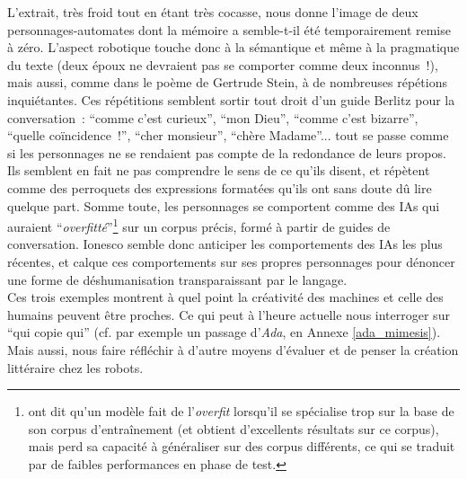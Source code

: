 \documentclass{article}
\begin{document}
				L'extrait, très froid tout en étant très cocasse, nous donne l'image de deux personnages-automates dont la mémoire a semble-t-il été temporairement remise à zéro. L'aspect robotique touche donc à la sémantique et même à la pragmatique du texte (deux époux ne devraient pas se comporter comme deux inconnus~!), mais aussi, comme dans le poème de Gertrude Stein, à de nombreuses répétions inquiétantes. Ces répétitions semblent sortir tout droit d'un guide Berlitz pour la conversation~: ``comme c'est curieux'', ``mon Dieu'', ``comme c'est
				bizarre'', ``quelle coïncidence~!'', ``cher monsieur'', ``chère Madame''... tout se passe comme si les personnages ne se rendaient pas compte de la redondance de leurs propos. Ils semblent en fait ne pas comprendre le sens de ce qu'ils disent, et répètent comme des perroquets des expressions formatées qu'ils ont sans doute dû lire quelque part. Somme toute, les personnages se comportent comme des IAs qui auraient ``\textit{overfitté}''\footnote{ont dit qu'un modèle fait de l'\textit{overfit} lorsqu'il se spécialise trop sur la base de son corpus d'entraînement (et obtient d'excellents résultats sur ce corpus), mais perd sa capacité à généraliser sur des corpus différents, ce qui se traduit par de faibles performances en phase de test.} sur un corpus précis, formé à partir de guides de conversation. Ionesco semble donc anticiper les comportements des IAs les plus récentes, et calque ces comportements sur ses propres personnages pour dénoncer une forme de déshumanisation transparaissant par le langage.\\
				
				
				Ces trois exemples montrent à quel point la créativité des machines et celle des humains peuvent être proches. Ce qui peut à l'heure actuelle nous interroger sur ``qui copie qui'' (cf. par exemple un passage d'\textit{Ada}, en Annexe \ref{ada_mimesis}). Mais aussi, nous faire réfléchir à d'autre moyens d'évaluer et de penser la création littéraire chez les robots.
\end{document}
